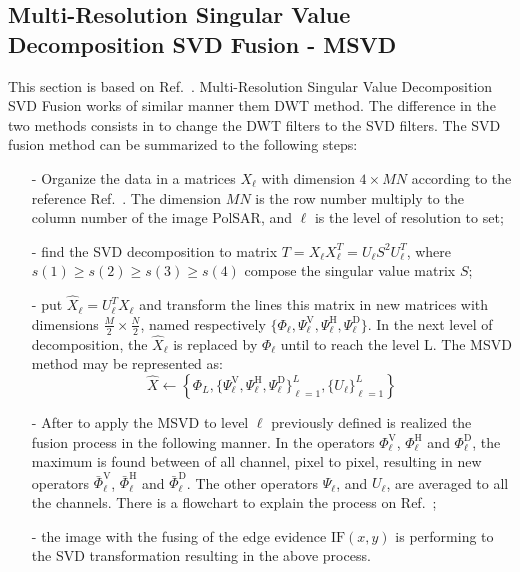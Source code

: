 \documentclass[conference]{IEEEtran}
\begin{document}
\subsection{Multi-Resolution Singular Value Decomposition SVD Fusion - MSVD}
This section is based on Ref.~\cite{naidu}. Multi-Resolution Singular Value Decomposition SVD Fusion works of similar manner them DWT method.  The difference in the two methods consists in to change the DWT filters to the SVD filters. The SVD fusion method can be summarized to the following steps:
\begin{itemize}
\item[-] Organize the data in a matrices $X_\ell$ with dimension $4\times MN$ according to the reference Ref.~\cite{naidu}. The dimension $MN$ is the row number multiply to the  column number of the image PolSAR, and $\ell$ is the level of resolution to set;  
\item[-] find the SVD decomposition to matrix $T=X_\ell X_\ell^T=U_\ell S^2 U_\ell^T$, where $s(1)\geq s(2) \geq s(3) \geq s(4)$ compose the singular value matrix $S$;
\item[-] put $\widehat{X}_\ell=U_\ell^TX_\ell$ and transform the lines this matrix in new matrices with dimensions $\frac{M}{2}\times\frac{N}{2}$, named respectively $\{\Phi_\ell, \Psi_\ell^\text{V}, \Psi_\ell^\text{H}, \Psi_\ell^\text{D}\}$. In the next level of decomposition, the $\widehat{X}_\ell$ is replaced by $\Phi_\ell$ until to reach the level L. The MSVD method may be represented as:
\begin{equation}\label{msvd_iter}
\widehat{X}\leftarrow \left\{\Phi_L,\{\Psi_\ell^\text{V},\Psi_\ell^\text{H},\Psi_\ell^\text{D} \}_{\ell=1}^L,\{U_\ell\}_{\ell=1}^L \right\}
\end{equation}
\item[-] After to apply the MSVD to level $\ell$ previously defined is realized the fusion process in the following manner. In the operators $\Phi_\ell^\text{V}$, $\Phi_\ell^\text{H}$ and $\Phi_\ell^\text{D}$, the maximum is found between of all channel, pixel to pixel, resulting in new operators $\bar{\Phi}_\ell^\text{V}$, $\bar{\Phi}_\ell^\text{H}$ and $\bar{\Phi}_\ell^\text{D}$. The other operators $\Psi_\ell$, and $U_\ell$, are averaged to all the channels. There is a  flowchart to  explain the process on Ref.~\cite{naidu};
\item[-] the image with the fusing of the edge evidence $\text{IF}(x,y)$ is performing to the SVD transformation resulting in the above process. 
\end{itemize}
\end{document}
